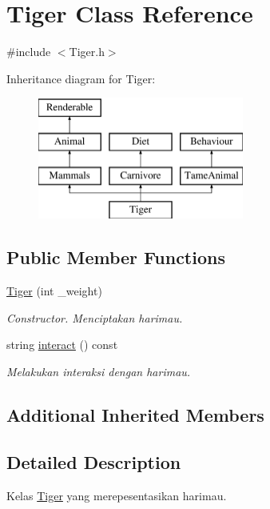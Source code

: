\hypertarget{classTiger}{\section{Tiger Class Reference}
\label{classTiger}
}


{\ttfamily \#include $<$Tiger.\+h$>$}

Inheritance diagram for Tiger\+:\begin{figure}[H]
\begin{center}
\leavevmode
\includegraphics[height=4.000000cm]{classTiger}
\end{center}
\end{figure}
\subsection*{Public Member Functions}
\begin{DoxyCompactItemize}
\item 
\hypertarget{classTiger_a6b001b50f4e121add39d77e4dea2f0d8}{\hyperlink{classTiger_a6b001b50f4e121add39d77e4dea2f0d8}{Tiger} (int \+\_\+weight)}\label{classTiger_a6b001b50f4e121add39d77e4dea2f0d8}

\begin{DoxyCompactList}\small\item\em Constructor. Menciptakan harimau. \end{DoxyCompactList}\item 
string \hyperlink{classTiger_ac602680f7e8f50b4c1ca1892ce459a4e}{interact} () const 
\begin{DoxyCompactList}\small\item\em Melakukan interaksi dengan harimau. \end{DoxyCompactList}\end{DoxyCompactItemize}
\subsection*{Additional Inherited Members}


\subsection{Detailed Description}
Kelas \hyperlink{classTiger}{Tiger} yang merepesentasikan harimau. 

